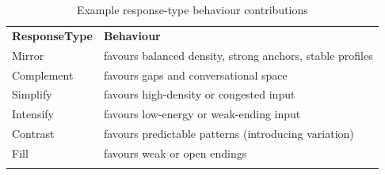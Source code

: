 \begin{longtable}[]{@{}
  >{\raggedright\arraybackslash}p{}
  >{\raggedright\arraybackslash}p{}@{}}
\caption{Example response-type behaviour contributions}\label{tab:response-type-behaviours}\\
\toprule\noalign{}
\begin{minipage}[b]{\linewidth}\centering
\textbf{ResponseType}
\end{minipage} & \begin{minipage}[b]{\linewidth}\centering
\textbf{Behaviour}
\end{minipage} \\
\begin{minipage}[b]{\linewidth}\raggedright
Mirror
\end{minipage} & \begin{minipage}[b]{\linewidth}\raggedright
favours balanced density, strong anchors, stable profiles
\end{minipage} \\
\begin{minipage}[b]{\linewidth}\raggedright
Complement
\end{minipage} & \begin{minipage}[b]{\linewidth}\raggedright
favours gaps and conversational space
\end{minipage} \\
\begin{minipage}[b]{\linewidth}\raggedright
Simplify
\end{minipage} & \begin{minipage}[b]{\linewidth}\raggedright
favours high-density or congested input
\end{minipage} \\
\begin{minipage}[b]{\linewidth}\raggedright
Intensify
\end{minipage} & \begin{minipage}[b]{\linewidth}\raggedright
favours low-energy or weak-ending input
\end{minipage} \\
\begin{minipage}[b]{\linewidth}\raggedright
Contrast
\end{minipage} & \begin{minipage}[b]{\linewidth}\raggedright
favours predictable patterns (introducing variation)
\end{minipage} \\
\begin{minipage}[b]{\linewidth}\raggedright
Fill
\end{minipage} & \begin{minipage}[b]{\linewidth}\raggedright
favours weak or open endings
\end{minipage} \\
\midrule\noalign{}
\endhead
\bottomrule\noalign{}
\endlastfoot
\end{longtable}


